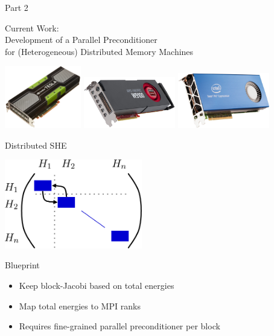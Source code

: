 \documentclass[usepdftitle=false,handout,10pt]{beamer}
\begin{document}


\begin{frame}{Part 2}
 \begin{center}
  Current Work: \\
  Development of a Parallel Preconditioner \\ 
  for (Heterogeneous) Distributed Memory Machines
 \end{center} 
 \vspace*{1cm}
 \begin{center}
  \includegraphics[width=0.25\textwidth]{figures/TeslaK20} \hfill
  \includegraphics[width=0.3\textwidth]{figures/w9100} \hfill
  \includegraphics[width=0.3\textwidth]{figures/xeon-phi}
 \end{center}

\end{frame}


\begin{frame}{Distributed SHE}

  \begin{center}
    \includegraphics[width=0.45\textwidth]{matrix-structure-2}
  \end{center}

  \pause
  
  \begin{block}{Blueprint}
   \begin{itemize}
    \item Keep block-Jacobi based on total energies
    \item Map total energies to MPI ranks
    \item Requires fine-grained parallel preconditioner per block
   \end{itemize}
  \end{block}
  
\end{frame}
\end{document}
